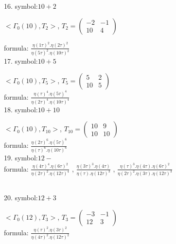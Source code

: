 

16. symbol:$ 10+2 $

$ < \Gamma_0 ( 10 ), T_2 >  $,
$
T_2 = 
\left(
\begin{array}{cc}
-2 & -1 \\
10 & 4
\end{array}
\right)
$

formula: 
$ \frac{\eta(1\tau)^2 . \eta(2\tau)^2}{\eta(5\tau)^2 . \eta(10\tau)^2} $
\\

17. symbol:$ 10+5 $

$ < \Gamma_0 ( 10 ), T_5 >  $,
$
T_5 = 
\left(
\begin{array}{cc}
5 & 2 \\
10 & 5
\end{array}
\right)
$
\\

formula: 
$ \frac{\eta(\tau)^4 . \eta(5\tau)^4}{\eta(2\tau)^4 . \eta(10\tau)^4} $
\\

18. symbol:$ 10+10 $

$ < \Gamma_0 ( 10 ), T_{10} >  $,
$
T_{10} = 
\left(
\begin{array}{cc}
10 & 9 \\
10 & 10
\end{array}
\right)
$
\\

formula: 
$ \frac{\eta(2\tau)^6 . \eta(5\tau)^6}{\eta(\tau)^6 . \eta(10\tau)^6} $
\\

19. symbol:$ 12- $
\\

formula: 
$ \frac{\eta(4\tau)^4 . \eta(6\tau)^2}{\eta(2\tau)^2 . \eta(12\tau)^4} $
, 
$ \frac{\eta(3\tau)^3 . \eta(4\tau)}{\eta(\tau) . \eta(12\tau)^3} $
, 
$ \frac{\eta(\tau)^3 . \eta(4\tau).\eta(6\tau)^2}{\eta(2\tau)^2 .\eta(3\tau). \eta(12\tau)^3} $

\\

20. symbol:$ 12+3 $

$ < \Gamma_0 ( 12 ), T_{3} >  $,
$
T_{3} = 
\left(
\begin{array}{cc}
-3 & -1 \\
12 & 3
\end{array}
\right)
$
\\

formula: 
$ \frac{\eta(\tau)^2 . \eta(3\tau)^2}{\eta(4\tau)^2 . \eta(12\tau)^2} $
\\

